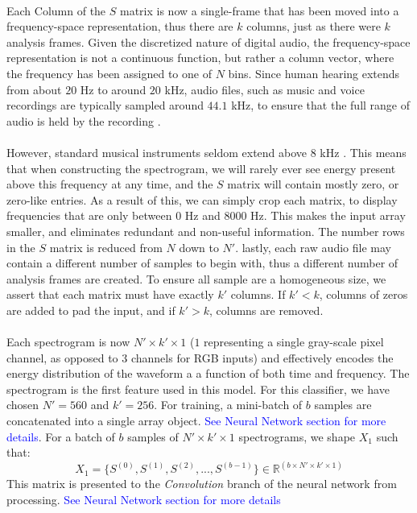 \documentclass[12pt,letterpaper]{article}
\begin{document}
\paragraph*{}Each Column of the $S$ matrix is now a single-frame that has been moved into a frequency-space representation, thus there are $k$ columns, just as there were $k$ analysis frames. Given the discretized nature of digital audio, the frequency-space representation is not a continuous function, but rather a column vector, where the frequency has been assigned to one of $N$ bins. Since human hearing extends from about $20$ Hz to around $20$ kHz, audio files, such as music and voice recordings are typically sampled around $44.1$ kHz, to ensure that the full range of audio is held by the recording \cite{Olson,Virtanen}. 

\paragraph*{}However, standard musical instruments seldom extend above $8$ kHz \cite{Olson,Virtanen,White}. This means that when constructing the spectrogram, we will rarely ever see energy present above this frequency at any time, and the $S$ matrix will contain mostly zero, or zero-like entries. As a result of this, we can simply crop each matrix, to display frequencies that are only between $0$ Hz and $8000$ Hz. This makes the input array smaller, and eliminates redundant and non-useful information. The number rows in the $S$ matrix is reduced from $N$ down to $N'$. lastly, each raw audio file may contain a different number of samples to begin with, thus a different number of analysis frames are created. To ensure all sample are a homogeneous size, we assert that each matrix must have exactly $k'$ columns. If $k' < k$, columns of zeros are added to pad the input, and if $k' > k$, columns are removed.

\paragraph*{}Each spectrogram is now $N' \times k' \times 1$ ($1$ representing a single gray-scale pixel channel, as opposed to $3$ channels for RGB inputs) and effectively encodes the energy distribution of the waveform a a function of both time and frequency. The spectrogram is the first feature used in this model. For this classifier, we have chosen $N' = 560$ and $k' = 256$. For training, a mini-batch of $b$ samples are concatenated into a single array object. \textcolor{blue}{See Neural Network section for more details}. For a batch of $b$ samples of $N' \times k' \times 1$ spectrograms, we shape $X_1$ such that:
\begin{equation}
\label{eqn-X1 shape}
X_1 = \big\{ S^{(0)},S^{(1)},S^{(2)}, ... , S^{(b-1)} \big\} \in \mathbb{R}^{(b \times N' \times k' \times 1)}
\end{equation}
This matrix is presented to the \textit{Convolution} branch of the neural network from processing. \textcolor{blue}{See Neural Network section for more details}
\end{document}
